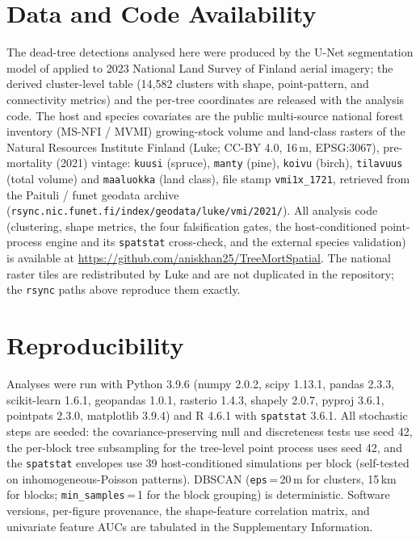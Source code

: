 \documentclass[twocolumn]{article}
\begin{document}
\section*{Data and Code Availability}
The dead-tree detections analysed here were produced by the U-Net segmentation model of
\citet{junttila2024significant} applied to 2023 National Land Survey of Finland aerial imagery; the
derived cluster-level table (14,582 clusters with shape, point-pattern, and connectivity metrics) and
the per-tree coordinates are released with the analysis code. The host and species covariates are the
public multi-source national forest inventory (MS-NFI / MVMI) growing-stock volume and land-class
rasters of the Natural Resources Institute Finland (Luke; CC-BY 4.0, 16\,m, EPSG:3067), pre-mortality
(2021) vintage: \texttt{kuusi} (spruce), \texttt{manty} (pine), \texttt{koivu} (birch),
\texttt{tilavuus} (total volume) and \texttt{maaluokka} (land class), file stamp \texttt{vmi1x\_1721},
retrieved from the Paituli / funet geodata archive
(\texttt{rsync.nic.funet.fi/index/geodata/luke/vmi/2021/}). All analysis code (clustering, shape
metrics, the four falsification gates, the host-conditioned point-process engine and its
\texttt{spatstat} cross-check, and the external species validation) is available at
\url{https://github.com/aniskhan25/TreeMortSpatial}. The national raster tiles are redistributed by
Luke and are not duplicated in the repository; the \texttt{rsync} paths above reproduce them exactly.

\section*{Reproducibility}
Analyses were run with Python 3.9.6 (numpy 2.0.2, scipy 1.13.1, pandas 2.3.3, scikit-learn 1.6.1,
geopandas 1.0.1, rasterio 1.4.3, shapely 2.0.7, pyproj 3.6.1, pointpats 2.3.0, matplotlib 3.9.4) and
R 4.6.1 with \texttt{spatstat} 3.6.1. All stochastic steps are seeded: the covariance-preserving null
and discreteness tests use seed 42, the per-block tree subsampling for the tree-level point process
uses seed 42, and the \texttt{spatstat} envelopes use 39 host-conditioned simulations per block
(self-tested on inhomogeneous-Poisson patterns). DBSCAN (\texttt{eps}\,=\,20\,m for clusters,
15\,km for blocks; \texttt{min\_samples}\,=\,1 for the block grouping) is deterministic. Software
versions, per-figure provenance, the shape-feature correlation matrix, and univariate feature AUCs
are tabulated in the Supplementary Information.



\end{document}
